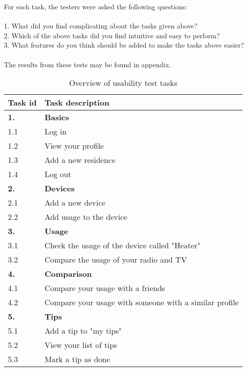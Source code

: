 For each task, the testers were asked the following questions:\\\\
1. What did you find complicating about the tasks given above?\\
2. Which of the above tasks did you find intuitive and easy to perform?\\
3. What features do you think should be added to make the tasks above easier?\\\\
The results from these tests may be found in appendix.

\begin{table}[H]
\centering
\begin{tabular}{|l|p{10.5cm}|}
\hline
\textbf{Task id }& \textbf{Task description}\\\hline
\textbf{1.}&\textbf{Basics}\\\hline
1.1 & Log in\\\hline
1.2 & View your profile\\\hline
1.3 & Add a new residence\\\hline
1.4 & Log out\\\hline
\textbf{2.}&\textbf{Devices}\\\hline
2.1 & Add a new device\\\hline
2.2 & Add usage to the device\\\hline
\textbf{3.}&\textbf{Usage}\\\hline
3.1 & Check the usage of the device called "Heater"\\\hline
3.2 & Compare the usage of your radio and TV\\\hline
\textbf{4.}&\textbf{Comparison}\\\hline
4.1 & Compare your usage with a friends\\\hline
4.2 & Compare your usage with someone with a similar profile\\\hline
\textbf{5.}&\textbf{Tips}\\\hline
5.1 & Add a tip to "my tips"\\\hline
5.2 & View your list of tips\\\hline
5.3 & Mark a tip as done\\\hline
\end{tabular}
\caption{Overview of usability test tasks}
\label{tab:usabilityTests}
\end{table}